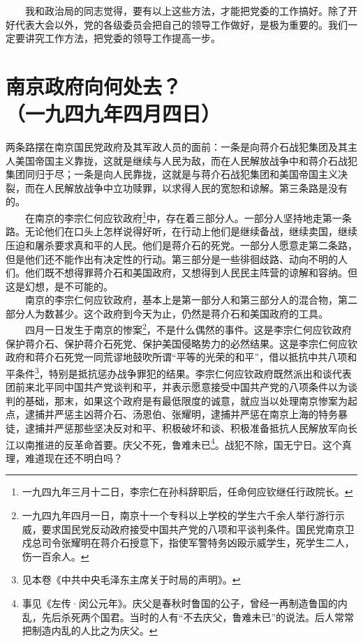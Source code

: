 \documentclass[cn,11pt,chinese]{elegantbook}
\def\myformat#1{\hfil\hfil #1}
\begin{document}
　　我和政治局的同志觉得，要有以上这些方法，才能把党委的工作搞好。除了开好代表大会以外，党的各级委员会把自己的领导工作做好，是极为重要的。我们一定要讲究工作方法，把党委的领导工作提高一步。\\
\newpage\section*{\myformat{南京政府向何处去？}\\\myformat{（一九四九年四月四日）}}
两条路摆在南京国民党政府及其军政人员的面前：一条是向蒋介石战犯集团及其主人美国帝国主义靠拢，这就是继续与人民为敌，而在人民解放战争中和蒋介石战犯集团同归于尽；一条是向人民靠拢，这就是与蒋介石战犯集团和美国帝国主义决裂，而在人民解放战争中立功赎罪，以求得人民的宽恕和谅解。第三条路是没有的。\\
　　在南京的李宗仁何应钦政府\footnote[1]{ 一九四九年三月十二日，李宗仁在孙科辞职后，任命何应钦继任行政院长。}中，存在着三部分人。一部分人坚持地走第一条路。无论他们在口头上怎样说得好听，在行动上他们是继续备战，继续卖国，继续压迫和屠杀要求真和平的人民。他们是蒋介石的死党。一部分人愿意走第二条路，但是他们还不能作出有决定性的行动。第三部分是一些徘徊歧路、动向不明的人们。他们既不想得罪蒋介石和美国政府，又想得到人民民主阵营的谅解和容纳。但这是幻想，是不可能的。\\
　　南京的李宗仁何应钦政府，基本上是第一部分人和第三部分人的混合物，第二部分人为数甚少。这个政府到今天为止，仍然是蒋介石和美国政府的工具。\\
　　四月一日发生于南京的惨案\footnote[2]{ 一九四九年四月一日，南京十一个专科以上学校的学生六千余人举行游行示威，要求国民党反动政府接受中国共产党的八项和平谈判条件。国民党南京卫戍总司令张耀明在蒋介石授意下，指使军警特务凶殴示威学生，死学生二人，伤一百余人。}，不是什么偶然的事件。这是李宗仁何应钦政府保护蒋介石、保护蒋介石死党、保护美国侵略势力的必然结果。这是李宗仁何应钦政府和蒋介石死党一同荒谬地鼓吹所谓“平等的光荣的和平”，借以抵抗中共八项和平条件\footnote[3]{ 见本卷《中共中央毛泽东主席关于时局的声明》。}，特别是抵抗惩办战争罪犯的结果。李宗仁何应钦政府既然派出和谈代表团前来北平同中国共产党谈判和平，并表示愿意接受中国共产党的八项条件以为谈判的基础，那末，如果这个政府是有最低限度的诚意，就应当以处理南京惨案为起点，逮捕并严惩主凶蒋介石、汤恩伯、张耀明，逮捕并严惩在南京上海的特务暴徒，逮捕并严惩那些坚决反对和平、积极破坏和谈、积极准备抵抗人民解放军向长江以南推进的反革命首要。庆父不死，鲁难未已\footnote[4]{ 事见《左传·闵公元年》。庆父是春秋时鲁国的公子，曾经一再制造鲁国的内乱，先后杀死两个国君。当时的人有“不去庆父，鲁难未已”的说法。后人常常把制造内乱的人比之为庆父。}。战犯不除，国无宁日。这个真理，难道现在还不明白吗？\\
\end{document}
